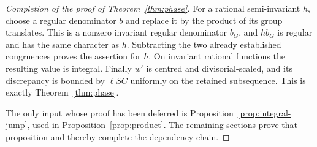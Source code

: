 \begin{proof}[Completion of the proof of Theorem~\ref{thm:phase}]
For a rational semi-invariant $h$, choose a regular denominator
$b$ and replace it by the product of its group translates.
This is a nonzero invariant regular denominator $b_G$, and
$hb_G$ is regular and has the same character as $h$.
Subtracting the two already established congruences proves
the assertion for $h$. On invariant rational functions the
resulting value is integral. Finally $w'$ is centred and
divisorial-scaled, and its discrepancy is bounded by
$\ell S C$ uniformly on the retained subsequence. This is
exactly Theorem~\ref{thm:phase}.

The only input whose proof has been deferred is
Proposition~\ref{prop:integral-jump}, used in
Proposition~\ref{prop:product}. The remaining sections prove
that proposition and thereby complete the dependency chain.
\end{proof}
